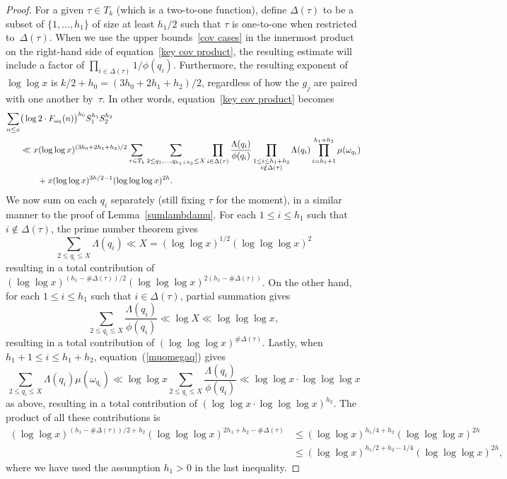 \documentclass[12pt,reqno]{amsart}
\theoremstyle{definition}
\begin{document}
\begin{proof}
For a given $\tau\in T_k$ (which is a two-to-one function), define $\Delta(\tau)$ to be a subset of $\{1,\dots,h_1\}$ of size at least $h_1/2$ such that $\tau$ is one-to-one when restricted to~$\Delta(\tau)$. When we use the upper bounds~\eqref{cov cases} in the innermost product on the right-hand side of equation~\eqref{key cov product}, the resulting estimate will include a factor of $\prod_{i\in\Delta(\tau)} 1/\phi(q_i)$.
Furthermore, the resulting exponent of $\log\log x$ is $k/2+h_0 = (3h_0+2h_1+h_2)/2$, regardless of how the $g_j$ are paired with one another by~$\tau$. In other words, equation~\eqref{key cov product} becomes
\begin{align}  \label{Lee's trick!}
\sum_{n \leq x} & \big( \log 2 {}\cdot F_{\omega_0}(n) \big)^{h_0} S_1^{h_1}S_2^{h_2} \\
&\ll x (\log\log x)^{(3h_0+2h_1+h_2)/2} \sum_{\tau \in T_k} \sum_{2\le q_1, \ldots, q_{h_1 + h_2} \leq X} \prod_{i\in\Delta(\tau)} \frac{\Lambda(q_i)}{\phi(q_i)} \prod_{\substack{1\le i\le h_1 + h_2 \\ i\notin\Delta(\tau)}} \Lambda(q_i) \prod_{i = h_1 + 1}^{h_1 + h_2} \mu(\omega_{q_i}) \notag \\
&\qquad{}+ x (\log\log x)^{3h/2 - 1} (\log\log\log x)^{2h}. \notag
\end{align}
We now sum on each $q_i$ separately (still fixing $\tau$ for the moment), in a similar manner to the proof of Lemma~\ref{sumlambdamu}. For each $1 \leq i \leq h_1$ such that $i\notin\Delta(\tau)$, the prime number theorem gives
\[
\sum_{2\le q_i \leq X} \Lambda(q_i) \ll X = (\log\log x)^{1/2}(\log\log\log x)^2
\]
resulting in a total contribution of $(\log\log x)^{(h_1-\#\Delta(\tau))/2}(\log\log\log x)^{2(h_1-\#\Delta(\tau))}$. On the other hand, for each $1 \leq i \leq h_1$ such that $i\in\Delta(\tau)$, partial summation gives
\[
\sum_{2\le q_i \leq X} \frac{\Lambda(q_i)}{\phi(q_i)} \ll \log X \ll \log\log\log x,
\]
resulting in a total contribution of $(\log\log\log x)^{\#\Delta(\tau)}$.
Lastly, when $h_1 + 1 \leq i \leq h_1 + h_2$, equation~(\ref{muomegaq}) gives
\[
\sum_{2\le q_i \leq X} \Lambda(q_i) \mu(\omega_{q_i}) \ll \log\log x \sum_{2\le q_i \leq X} \frac{\Lambda(q_i)}{\phi(q_i)} \ll \log\log x \cdot \log\log\log x
\]
as above, resulting in a total contribution of $(\log\log x \cdot \log\log\log x)^{h_2}$. The product of all these contributions is
\begin{align*}
(\log\log x)^{(h_1-\#\Delta(\tau))/2+h_2} (\log\log\log x)^{2h_1+h_2-\#\Delta(\tau)} &\le (\log\log x)^{h_1/4+h_2} (\log\log\log x)^{2h} \\
&\le (\log\log x)^{h_1/2+h_2-1/4} (\log\log\log x)^{2h},
\end{align*}
where we have used the assumption $h_1>0$ in the last inequality.


\end{proof}
\end{document}
